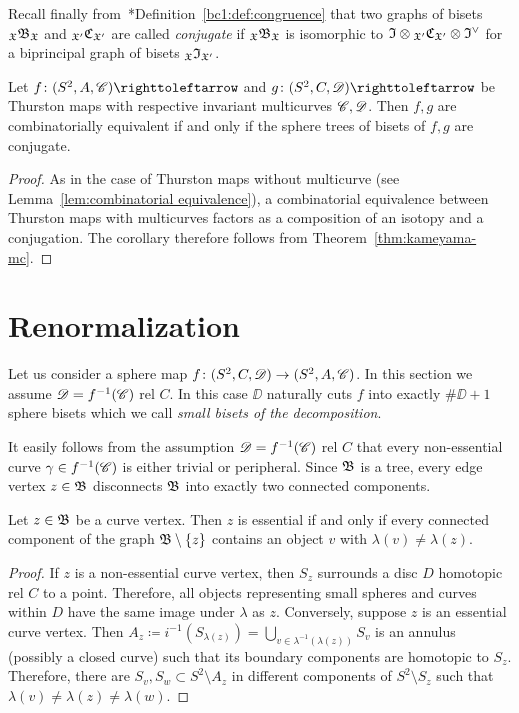 \documentclass{amsart}
\begin{document}
Recall finally
from~\cite{bartholdi-dudko:bc1}*{Definition~\ref{bc1:def:congruence}}
that two graphs of bisets $\subscript\gf\gfB_\gf$ and
$\subscript{\gf'} \gfC_{\gf'}$ are called \emph{conjugate} if
$\subscript\gf\gfB_\gf$ is isomorphic to
$\gfI \otimes \subscript{\gf'} \gfC_{\gf'} \otimes \gfI^\vee$ for a
biprincipal graph of bisets $\subscript\gf\gfI_{\gf'}$.

\begin{cor}\label{cor:kameyama-mc}
  Let $f\colon(S^2,A,\CC)\selfmap$ and $g\colon(S^2,C,\DD)\selfmap$ be
  Thurston maps with respective invariant multicurves ${\mathscr C},{\mathscr D}$. Then
  $f,g$ are combinatorially equivalent if and only if the sphere trees
  of bisets of $f,g$ are conjugate.
\end{cor}
\begin{proof}
  As in the case of Thurston maps without multicurve (see
  Lemma~\ref{lem:combinatorial equivalence}), a combinatorial
  equivalence between Thurston maps with multicurves factors as a
  composition of an isotopy and a conjugation. The corollary therefore
  follows from Theorem~\ref{thm:kameyama-mc}.
\end{proof}

\section{Renormalization}
Let us consider a sphere map $f\colon(S^2,C,{\mathscr D})\to(S^2,A,{\mathscr C})$. In
this section we assume ${\mathscr D}= f^{-1}({\mathscr C})$ rel $C$. In this case $\DD$
naturally cuts $f$ into exactly $\#\DD+1$ sphere bisets which we call
\emph{small bisets of the decomposition}.
 
It easily follows from the assumption ${\mathscr D}= f^{-1}({\mathscr C})$ rel $C$ that
every non-essential curve $\gamma\in f^{-1}({\mathscr C})$ is either trivial or
peripheral. Since ${\mathfrak B}$ is a tree, every edge vertex $z\in
{\mathfrak B}$ disconnects ${\mathfrak B}$ into exactly two connected
components.

\begin{lem}\label{lem:PropOfLambda}
  Let $z\in {\mathfrak B}$ be a curve vertex. Then $z$ is essential if and only
  if every connected component of the graph ${\mathfrak B}\setminus \{z\}$
  contains an object $v$ with $\lambda(v)\neq\lambda(z)$.
\end{lem}
\begin{proof}
  If $z$ is a non-essential curve vertex, then $S_z$ surrounds a disc
  $D$ homotopic rel $C$ to a point. Therefore, all objects
  representing small spheres and curves within $D$ have the same image
  under $\lambda$ as $z$. Conversely, suppose $z$ is an essential
  curve vertex. Then
  $A_z\coloneqq i^{-1}(S_{\lambda(z)})=\bigcup_{v\in
    \lambda^{-1}(\lambda(z))}S_v$ is an annulus (possibly a closed
  curve) such that its boundary components are homotopic to
  $S_z$. Therefore, there are $S_v,S_w\subset S^2\setminus A_z$ in
  different components of $S^2\setminus S_z$ such that
  $\lambda(v)\neq\lambda(z)\neq\lambda(w)$.
\end{proof}
\end{document}

